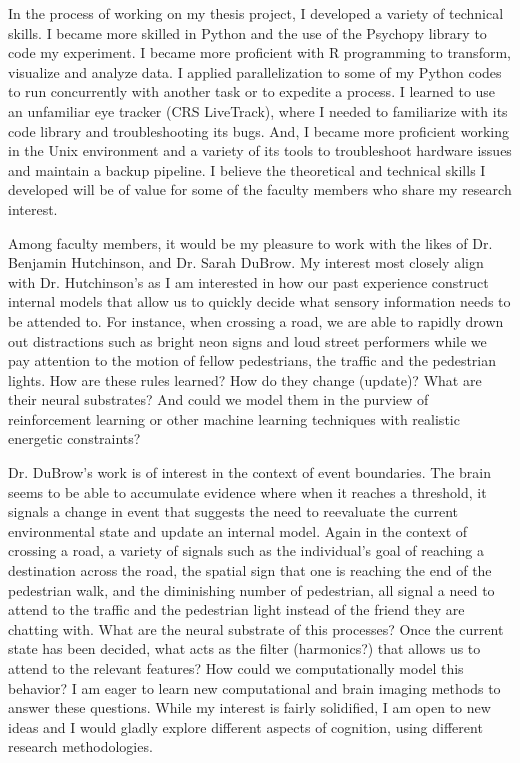 \documentclass[12pt]{article}
\begin{document}
	In the process of working on my thesis project, I developed a variety of technical skills. I became more skilled in Python and the use of the Psychopy library to code my experiment. I became more proficient with R programming to transform, visualize and analyze data. I applied parallelization to some of my Python codes to run concurrently with another task or to expedite a process. I learned to use an unfamiliar eye tracker (CRS LiveTrack), where I needed to familiarize with its code library and troubleshooting its bugs. And, I became more proficient working in the Unix environment and a variety of its tools to troubleshoot hardware issues and maintain a backup pipeline. I believe the theoretical and technical skills I developed will be of value for some of the faculty members who share my research interest.
	
	Among faculty members, it would be my pleasure to work with the likes of Dr. Benjamin Hutchinson, and Dr. Sarah DuBrow. My interest most closely align with Dr.  Hutchinson’s as I am interested in how our past experience construct internal models that allow us to quickly decide what sensory information needs to be attended to. For instance, when crossing a road, we are able to rapidly drown out distractions such as bright neon signs and loud street performers while we pay attention to the motion of fellow pedestrians, the traffic and the pedestrian lights. How are these rules learned? How do they change (update)? What are their neural substrates? And could we model them in the purview of reinforcement learning or other machine learning techniques with realistic energetic constraints?
	
	Dr. DuBrow’s work is of interest in the context of event boundaries. The brain seems to be able to accumulate evidence where when it reaches a threshold, it signals a change in event that suggests the need to reevaluate the current environmental state and update an internal model. Again in the context of crossing a road, a variety of signals such as the individual’s goal of reaching a destination across the road, the spatial sign that one is reaching the end of the pedestrian walk, and the diminishing number of pedestrian, all signal a need to attend to the traffic and the pedestrian light instead of the friend they are chatting with. What are the neural substrate of this processes? Once the current state has been decided, what acts as the filter (harmonics?) that allows us to attend to the relevant features? How could we computationally model this behavior? I am eager to learn new computational and brain imaging methods to answer these questions. While my interest is fairly solidified, I am open to new ideas and I would gladly explore different aspects of cognition, using different research methodologies.
	
\end{document}
